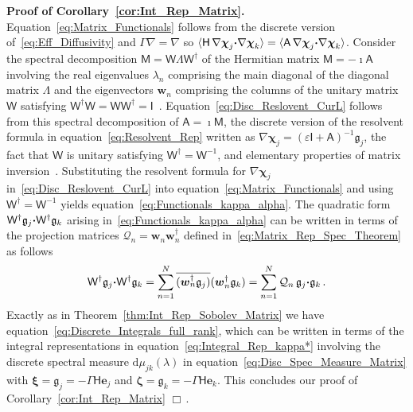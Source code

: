\documentclass[english,12pt,jmp,graphicx]{revtex4-1}
\newcommand{\vecw}{\boldsymbol{w}}
\newcommand{\vecxi}{\boldsymbol{\xi}}
\newcommand{\veczeta}{\boldsymbol{\zeta}}
\newcommand{\vecg}{\mathfrak{g}}
\newcommand{\vece}{\boldsymbol{e}}
\newcommand{\thmref}[1]{Theorem~\ref{#1}}
\newcommand{\corref}[1]{Corollary~\ref{#1}}
\newcommand{\bcdot}{\mbox{\boldmath${\cdot}$}}
\renewcommand{\d}{\mathrm{d}}
\newcommand{\vecchi}{\boldsymbol{\chi}}
\newcommand{\Hm}{\mathsf{H}}
\newcommand{\Mm}{\mathsf{M}}
\newcommand{\Am}{\mathsf{A}}
\newcommand{\Wm}{\mathsf{W}}
\newcommand{\Ib}{\mathsf{I}}
\newcommand{\Qc}{\mathcal{Q}}
\begin{document}
\noindent
\textbf{Proof of \corref{cor:Int_Rep_Matrix}.}
Equation~\eqref{eq:Matrix_Functionals} follows from
the discrete version of~\eqref{eq:Eff_Diffusivity} and 
$\Gamma\nabla=\nabla$ so 
$\langle\Hm\,\nabla\vecchi_j\bcdot\nabla\vecchi_k\rangle 
=\langle\Am\,\nabla\vecchi_j\bcdot\nabla\vecchi_k\rangle$.
Consider the spectral decomposition $\Mm=\Wm\Lambda\Wm^\dagger$ of
the Hermitian matrix $\Mm=-\imath\Am$ involving the real eigenvalues
$\lambda_n$ comprising the main  
diagonal of the diagonal matrix $\Lambda$ and the eigenvectors 
$\vecw_n$ comprising the columns of the unitary matrix $\Wm$
satisfying 
$\Wm^\dagger\Wm=\Wm\Wm^\dagger=\Ib$~\cite{Horn_Johnson-1990}.  
%
%
Equation~\eqref{eq:Disc_Reslovent_CurL} follows from 
this spectral decomposition of $\Am=\imath\Mm$, the discrete version of 
the resolvent formula in equation~\eqref{eq:Resolvent_Rep} written 
as $\nabla\vecchi_j=(\varepsilon\Ib+\Am)^{-1}\vecg_j$, 
the fact that $\Wm$ is unitary satisfying $\Wm^\dagger=\Wm^{-1}$,
and elementary properties of matrix
inversion~\cite{Horn_Johnson-1990}. Substituting the resolvent formula
for $\nabla\vecchi_j$ in~\eqref{eq:Disc_Reslovent_CurL}
into equation~\eqref{eq:Matrix_Functionals} and using $\Wm^\dagger=\Wm^{-1}$
yields equation~\eqref{eq:Functionals_kappa_alpha}. The quadratic form 
$\Wm^\dagger\vecg_j\bcdot\Wm^\dagger\vecg_k$ arising
in~\eqref{eq:Functionals_kappa_alpha} can be written in terms of the
projection matrices $\Qc_n=\vecw_n\vecw_n^\dagger$ defined
in~\eqref{eq:Matrix_Rep_Spec_Theorem} as follows   
%
\begin{align}\label{eq:Quadratic_W}
  \Wm^\dagger\vecg_j\bcdot\Wm^\dagger\vecg_k
  =\sum_{n=1}^N\overline{(\vecw_n^\dagger\vecg_j)}(\vecw_n^\dagger\vecg_k)
  =\sum_{n=1}^N\Qc_n\,\vecg_j\bcdot\vecg_k\,.  
\end{align}
%
Exactly as in \thmref{thm:Int_Rep_Sobolev_Matrix} we have
equation~\eqref{eq:Discrete_Integrals_full_rank}, which can be written
in terms of the integral representations  in
equation~\eqref{eq:Integral_Rep_kappa*} involving the discrete
spectral 
measure $\d\mu_{jk}(\lambda)$ in
equation~\eqref{eq:Disc_Spec_Measure_Matrix} with
$\vecxi=\vecg_j=-\Gamma\Hm\vece_j$ and
$\veczeta=\vecg_k=-\Gamma\Hm\vece_k$.
This concludes our proof of \corref{cor:Int_Rep_Matrix} $\Box\,.$
\end{document}
